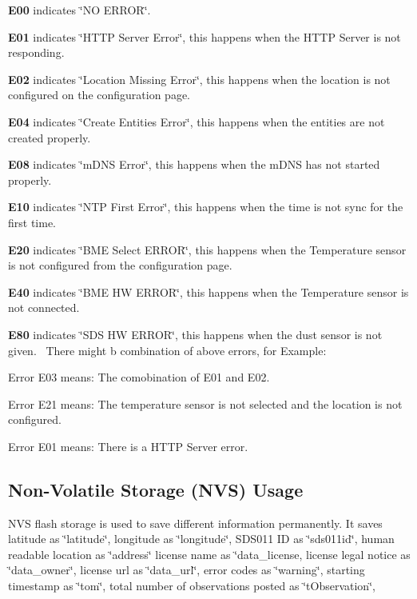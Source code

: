 \begin{DoxyEnumerate}
\item {\bfseries{E00}} indicates \char`\"{}\+N\+O E\+R\+R\+O\+R\char`\"{}.
\item {\bfseries{E01}} indicates \char`\"{}\+H\+T\+T\+P Server Error\char`\"{}, this happens when the H\+T\+TP Server is not responding.
\item {\bfseries{E02}} indicates \char`\"{}\+Location Missing Error\char`\"{}, this happens when the location is not configured on the configuration page.
\item {\bfseries{E04}} indicates \char`\"{}\+Create Entities Error\char`\"{}, this happens when the entities are not created properly.
\item {\bfseries{E08}} indicates \char`\"{}m\+D\+N\+S Error\char`\"{}, this happens when the m\+D\+NS has not started properly.
\item {\bfseries{E10}} indicates \char`\"{}\+N\+T\+P First Error\char`\"{}, this happens when the time is not sync for the first time.
\item {\bfseries{E20}} indicates \char`\"{}\+B\+M\+E Select E\+R\+R\+O\+R\char`\"{}, this happens when the Temperature sensor is not configured from the configuration page.
\item {\bfseries{E40}} indicates \char`\"{}\+B\+M\+E H\+W E\+R\+R\+O\+R\char`\"{}, this happens when the Temperature sensor is not connected.
\item {\bfseries{E80}} indicates \char`\"{}\+S\+D\+S H\+W E\+R\+R\+O\+R\char`\"{}, this happens when the dust sensor is not given.~\newline
 There might b combination of above errors, for Example\+:
\begin{DoxyEnumerate}
\item Error E03 means\+: The comobination of E01 and E02.
\item Error E21 means\+: The temperature sensor is not selected and the location is not configured.
\item Error E01 means\+: There is a H\+T\+TP Server error.
\end{DoxyEnumerate}
\end{DoxyEnumerate}\hypertarget{index_nvs}{}\subsection{Non-\/\+Volatile Storage (\+N\+V\+S) Usage}\label{index_nvs}
N\+VS flash storage is used to save different information permanently. It saves latitude as \char`\"{}latitude\char`\"{}, longitude as \char`\"{}longitude\char`\"{}, S\+D\+S011 ID as \char`\"{}sds011id\char`\"{}, human readable location as \char`\"{}address\char`\"{} license name as \char`\"{}data\+\_\+license, license legal notice as \char`\"{}data\+\_\+owner\char`\"{}, license url as \char`\"{}data\+\_\+url\char`\"{}, error codes as \char`\"{}warning\char`\"{},  starting timestamp as \char`\"{}tom\char`\"{}, total number of observations posted as \char`\"{}t\+Observation\char`\"{},

